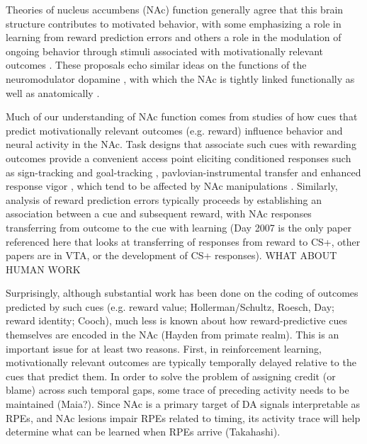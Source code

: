 \documentclass[11pt]{article}
\let\cite=\citep
\begin{document}
Theories of nucleus accumbens (NAc) function generally agree that this brain
structure contributes to motivated behavior, with some emphasizing a role in
learning from reward prediction errors
\cite{Averbeck2017,Joel2002,Khamassi2012,Lee2012,Maia2009,Schultz2016}\cite[see
  also the addiction literature on effects of drug
  rewards;][]{Carelli2009,Hyman2006,Kalivas2005} and others a role in the
modulation of ongoing behavior through stimuli associated with motivationally
relevant outcomes \cite[invigorating,
  directing;][]{Floresco2015,Nicola2010a,Salamone2012}. These proposals echo
similar ideas on the functions of the neuromodulator dopamine
\cite{Berridge2012,Maia2009,Salamone2012,Schultz2016}, with which the NAc is
tightly linked functionally as well as anatomically
\cite{Cheer2007,DuHoffmann2014,Ikemoto2007,Takahashi2016}.

Much of our understanding of NAc function comes from studies of how cues that
predict motivationally relevant outcomes (e.g. reward) influence behavior and
neural activity in the NAc. Task designs that associate such cues with rewarding
outcomes provide a convenient access point eliciting conditioned responses such
as sign-tracking and goal-tracking \cite{hearst1974sign,Robinson2009},
pavlovian-instrumental transfer \cite{Estes1943,Rescorla1967} and enhanced
response vigor \cite{Nicola2010a,Niv2007}, which tend to be affected by NAc
manipulations \cite{Chang2012,Corbit2011,Flagel2011} \cite[although not always
  straightforwardly (is Hauber
  appropriate?);][]{Chang2013,Hauber2000}. Similarly, analysis of reward
prediction errors typically proceeds by establishing an association between a
cue and subsequent reward, with NAc responses transferring from outcome to the
cue with learning \cite{Day2007a,Roitman2005,Setlow2003,Schultz1997}(Day 2007 is
the only paper referenced here that looks at transferring of responses from
reward to CS+, other papers are in VTA, or the development of CS+
responses). WHAT ABOUT HUMAN WORK

Surprisingly, although substantial work has been done on the coding of outcomes
predicted by such cues (e.g. reward value; Hollerman/Schultz, Roesch, Day;
reward identity; Cooch), much less is known about how reward-predictive cues
themselves are encoded in the NAc (Hayden from primate realm). This is an
important issue for at least two reasons. First, in reinforcement learning,
motivationally relevant outcomes are typically temporally delayed relative to
the cues that predict them. In order to solve the problem of assigning credit
(or blame) across such temporal gaps, some trace of preceding activity needs to
be maintained \cite{Lee2012} (Maia?). Since NAc is a primary target of DA
signals interpretable as RPEs, and NAc lesions impair RPEs related to timing,
its activity trace will help determine what can be learned when RPEs arrive
(Takahashi).
\end{document}
